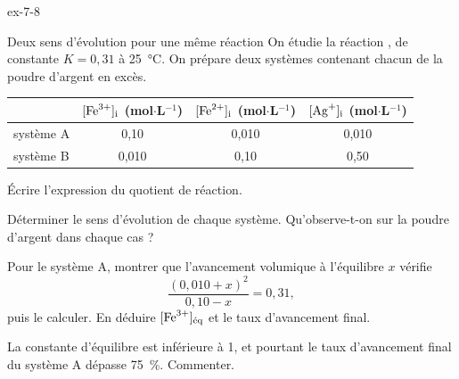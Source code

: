 \begin{blocLivre}{ex-7-8}
\begin{exercice}[2]{Deux sens d'évolution pour une même réaction}
On étudie la réaction , de constante $K=0{,}31$ à 25~°C. On prépare deux
systèmes contenant chacun de la poudre d'argent en excès.
\begin{center}\small\renewcommand{\arraystretch}{1.2}
\begin{tabular}{@{}l*{3}{c}@{}}\toprule
 & $[\ce{Fe^3+}]_\mathrm{i}$ (mol$\cdot$L$^{-1}$) & $[\ce{Fe^2+}]_\mathrm{i}$ (mol$\cdot$L$^{-1}$) & $[\ce{Ag+}]_\mathrm{i}$ (mol$\cdot$L$^{-1}$)\\\midrule
système A & 0,10 & 0,010 & 0,010\\
système B & 0,010 & 0,10 & 0,50\\\bottomrule
\end{tabular}\end{center}
\begin{questions}
\item Écrire l'expression du quotient de réaction.
\item Déterminer le sens d'évolution de chaque système. Qu'observe-t-on sur la poudre d'argent dans chaque cas ?
\item Pour le système A, montrer que l'avancement volumique à l'équilibre $x$ vérifie
\[\frac{(0{,}010+x)^2}{0{,}10-x}=0{,}31,\]
puis le calculer. En déduire $[\ce{Fe^3+}]_\text{éq}$ et le taux d'avancement final.
\item La constante d'équilibre est inférieure à 1, et pourtant le taux d'avancement final du système A dépasse 75~\%.
Commenter.
\end{questions}
\end{exercice}
\end{blocLivre}
